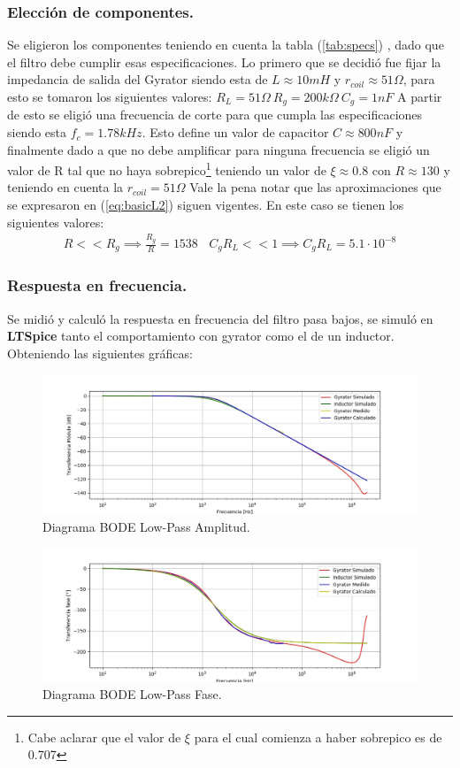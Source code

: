 \subsubsection{Elección de componentes.}
Se eligieron los componentes teniendo en cuenta la tabla (\ref{tab:specs}) , dado que el filtro debe cumplir esas especificaciones.
Lo primero que se decidió fue fijar la impedancia de salida del Gyrator siendo esta de $L \approx 10mH $ y $r_{coil} \approx 51\Omega $, para esto se tomaron los siguientes valores: $R_L = 51\Omega \ R_g = 200k\Omega \ C_g = 1nF$
A partir de esto se eligió una frecuencia de corte para que cumpla las especificaciones siendo esta  $f_c =1.78kHz $. Esto define un valor de capacitor $C \approx 800nF$ y finalmente dado a que no debe amplificar para ninguna frecuencia se eligió un valor de R tal que no haya sobrepico\footnote{Cabe aclarar que el valor de $\xi$ para el cual comienza a haber sobrepico es de 0.707} teniendo un valor de $\xi \approx 0.8 $ con $R \approx 130 $ y teniendo en cuenta la $r_{coil} = 51\Omega$  
Vale la pena notar que las aproximaciones que se expresaron en (\ref{eq:basicL2}) siguen vigentes. En este caso se tienen los siguientes valores:
\begin{align}  R<<R_g \implies  \frac{R_g}{R}=  1538 \ \ \ \ C_gR_L << 1 \implies C_gR_L =5.1\cdot 10^{-8} \end{align}


\subsubsection{Respuesta en frecuencia.}
Se midió y calculó la respuesta en frecuencia del filtro pasa bajos, se simuló en \textbf{LTSpice}  tanto el comportamiento con gyrator como el de un inductor. Obteniendo las siguientes gráficas:
\begin{figure}[H]	
	\centering
	\includegraphics[width=\textwidth]{ImagenesEj2/bodelp.jpg}
	\caption{Diagrama BODE Low-Pass Amplitud.}
	\label{fig:bodelp}
\end{figure}
\begin{figure}[H]	
	\centering
	\includegraphics[width=\textwidth]{ImagenesEj2/bodelpp.jpg}
	\caption{Diagrama BODE Low-Pass Fase.}
	\label{fig:bodelpp}
\end{figure}
